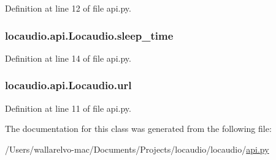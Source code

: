 Definition at line 12 of file api.\-py.

\hypertarget{classlocaudio_1_1api_1_1Locaudio_a0b5d0065ae0183383514e0ba1ed1858f}{
\subsubsection[{sleep\-\_\-time}]{\setlength{\rightskip}{0pt plus 5cm}locaudio.\-api.\-Locaudio.\-sleep\-\_\-time}}\label{classlocaudio_1_1api_1_1Locaudio_a0b5d0065ae0183383514e0ba1ed1858f}


Definition at line 14 of file api.\-py.

\hypertarget{classlocaudio_1_1api_1_1Locaudio_a97b12a0e2f549ea2d080e53d56609dfa}{
\subsubsection[{url}]{\setlength{\rightskip}{0pt plus 5cm}locaudio.\-api.\-Locaudio.\-url}}\label{classlocaudio_1_1api_1_1Locaudio_a97b12a0e2f549ea2d080e53d56609dfa}


Definition at line 11 of file api.\-py.



The documentation for this class was generated from the following file\-:\begin{DoxyCompactItemize}
\item 
/\-Users/wallarelvo-\/mac/\-Documents/\-Projects/locaudio/locaudio/\hyperlink{api_8py}{api.\-py}\end{DoxyCompactItemize}
